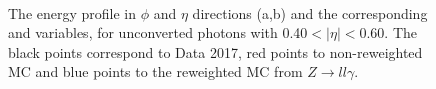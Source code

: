 \begin{figure}[ht]
    \centering
	 \\
    \caption{The energy profile in $\phi$ and $\eta$ directions (a,b) and the corresponding \Rphi and \Reta variables, for unconverted photons with 0.40$<|\eta|<$0.60. The black points correspond to Data 2017, red points to non-reweighted MC and blue points to the reweighted MC from $Z\rightarrow ll\gamma$.}
    \label{fig:gamma:ss:reweighting:photon:photon}
\end{figure}
